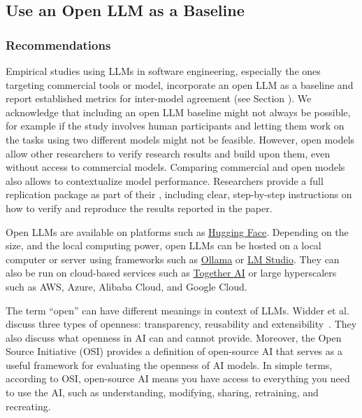 



\subsection{Use an Open LLM as a Baseline}

\subsubsection{Recommendations}

Empirical studies using LLMs in software engineering, especially the ones targeting commercial tools or model, \should incorporate an open LLM as a baseline and report established metrics for inter-model agreement (see Section \benchmarksmetrics).
We acknowledge that including an open LLM baseline might not always be possible, for example if the study involves human participants and letting them work on the tasks using two different models might not be feasible.
However, open models allow other researchers to verify research results and build upon them, even without access to commercial models.
Comparing commercial and open models also allows to contextualize model performance.
Researchers \should provide a full replication package as part of their \supplementarymaterial, including clear, step-by-step instructions on how to verify and reproduce the results reported in the paper.

Open LLMs are available on platforms such as \href{https://huggingface.co/}{Hugging Face}.
Depending on the size, and the local computing power, open LLMs can be hosted on a local computer or server using frameworks such as \href{https://ollama.com/}{Ollama} or \href{https://lmstudio.ai/}{LM Studio}.
They can also be run on cloud-based services such as \href{https://together.ai/}{Together AI} or large hyperscalers such as AWS, Azure, Alibaba Cloud, and Google Cloud.

The term ``open'' can have different meanings in context of LLMs.
Widder et al. discuss three types of openness: transparency, reusability and extensibility~\cite{widder2024open}.
They also discuss what openness in AI can and cannot provide.
Moreover, the Open Source Initiative (OSI) \cite{OSIAI2024} provides a definition of open-source AI that serves as a useful framework for evaluating the openness of AI models.
In simple terms, according to OSI, open-source AI means  you have access to everything you need to use the AI, such as understanding, modifying, sharing, retraining, and recreating.

